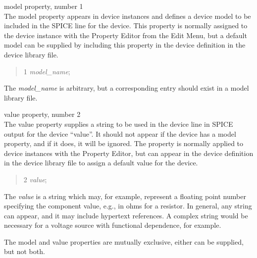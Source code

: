 \begin{description}
\item{\et model} property, number 1\\
The {\et model} property appears in device instances and defines a
device model to be included in the SPICE line for the device.  This
property is normally assigned to the device instance with the {\cb
Property Editor} from the {\cb Edit Menu}, but a default model can be
supplied by including this property in the device definition in the
device library file.
\begin{quote} 1 {\it model\_name\/};
\end{quote}
The {\it model\_name\/} is arbitrary, but a corresponding entry should
exist in a model library file.

\item{\et value} property, number 2\\
The {\et value} property supplies a string to be used in the device
line in SPICE output for the device ``value''.  It should not appear
if the device has a model property, and if it does, it will be
ignored.  The property is normally applied to device instances with
the {\cb Property Editor}, but can appear in the device definition
in the device library file to assign a default value for the device.
\begin{quote} 2 {\it value\/};
\end{quote}
The {\it value\/} is a string which may, for example, represent a
floating point number specifying the component value, e.g., in ohms
for a resistor.  In general, any string can appear, and it may include
hypertext references.  A complex string would be necessary for a
voltage source with functional dependence, for example.

The {\et model} and {\et value} properties are mutually exclusive,
either can be supplied, but not both.


\end{description}
